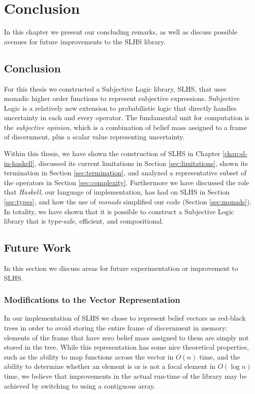 \documentclass[thesis.tex]{subfiles}
\begin{document}
\chapter{Conclusion}
\label{chap:conclusion}

In this chapter we present our concluding remarks, as well as discuss possible avenues for
future improvements to the SLHS library.



\section{Conclusion}

For this thesis we constructed a Subjective Logic library, SLHS, that uses monadic higher
order functions to represent subjective expressions. Subjective Logic is a relatively new
extension to probabilistic logic \cite{josang2001logic} that directly handles uncertainty
in each and every operator. The fundamental unit for computation is the \emph{subjective opinion},
which is a combination of belief mass assigned to a frame of discernment, plus a scalar value
representing uncertainty.

Within this thesis, we have shown the construction of SLHS in Chapter \ref{chap:sl-in-haskell},
discussed its current limitations in Section \ref{sec:limitations}, shown its termination in
Section \ref{sec:termination}, and analyzed a representative subset of the operators in
Section \ref{sec:complexity}. Furthermore we have discussed the role that \emph{Haskell}, our
language of implementation, has had on SLHS in Section \ref{sec:types}, and how the use of
\emph{monads} simplified our code (Section \ref{sec:monads}). In totality, we have shown that it
is possible to construct a Subjective Logic library that is type-safe, efficient, and compositional.



\section{Future Work}

In this section we discuss areas for future experimentation or improvement to SLHS.


\subsection{Modifications to the Vector Representation}

In our implementation of SLHS we chose to represent belief vectors as red-black trees in
order to avoid storing the entire frame of discernment in memory: elements of the frame
that have zero belief mass assigned to them are simply not stored in the tree. While this
representation has some nice theoretical properties, such as the ability to map functions
across the vector in $O (n)$ time, and the ability to determine whether an element is or is
not a focal element in $O (\log n)$ time, we believe that improvements in the actual run-time
of the library may be achieved by switching to using a contiguous array.
\end{document}
